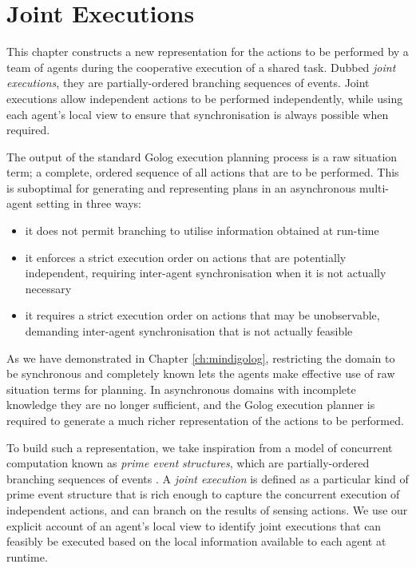 

\chapter{Joint Executions}

\label{ch:jointexec}

This chapter constructs a new representation for the actions to be
performed by a team of agents during the cooperative execution of
a shared task. Dubbed \emph{joint executions}, they are partially-ordered
branching sequences of events. Joint executions allow independent
actions to be performed independently, while using each agent's local
view to ensure that synchronisation is always possible when required.

The output of the standard Golog execution planning process is a raw
situation term; a complete, ordered sequence of all actions that are
to be performed. This is suboptimal for generating and representing
plans in an asynchronous multi-agent setting in three ways:

\begin{itemize}
\item it does not permit branching to utilise information obtained at run-time 
\item it enforces a strict execution order on actions that are potentially
independent, requiring inter-agent synchronisation when it is not
actually necessary 
\item it requires a strict execution order on actions that may be unobservable,
demanding inter-agent synchronisation that is not actually feasible 
\end{itemize}
As we have demonstrated in Chapter \ref{ch:mindigolog}, restricting
the domain to be synchronous and completely known lets the agents
make effective use of raw situation terms for planning. In asynchronous
domains with incomplete knowledge they are no longer sufficient, and
the Golog execution planner is required to generate a much richer
representation of the actions to be performed.

To build such a representation, we take inspiration from a model of
concurrent computation known as \emph{prime event} \emph{structures},
which are partially-ordered branching sequences of events \citep{npw79event_structures}.
A \emph{joint execution} is defined as a particular kind of prime
event structure that is rich enough to capture the concurrent execution
of independent actions, and can branch on the results of sensing actions.
We use our explicit account of an agent's local view to identify joint
executions that can feasibly be executed based on the local information
available to each agent at runtime.

